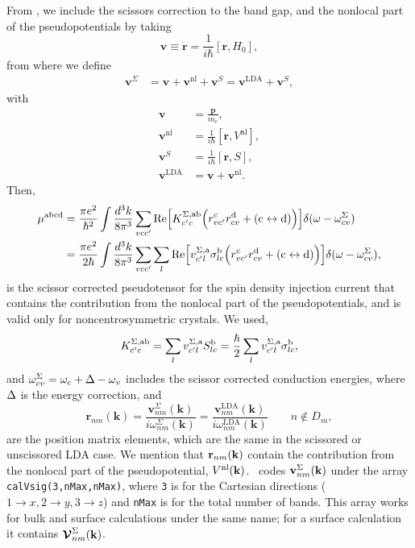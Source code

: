 \documentclass[floatfix,prb,aps,superscriptaddress,11pt]{revtex4}
\begin{document}
From , we include the scissors correction to
the band gap, and the nonlocal part of the pseudopotentials by taking
\begin{equation}
\mathbf{v}\equiv \dot{\mathbf{r}}=\frac{1}{i\hbar }[\mathbf{r},H_0],  
\label{mv}
\end{equation}
from where we define
\begin{align}
\mathbf{v}^\Sigma&=
\mathbf{v} 
+
\mathbf{v}^\mathrm{nl} 
+\mathbf{v}^S 
=
\mathbf{v}^\mathrm{LDA} 
+\mathbf{v}^S 
,
\label{vop2}
\end{align}
with
\begin{align}
\mathbf{v} 
&=\frac{\mathbf{p}}{m_e},
\nonumber\\
\mathbf{v}^\mathrm{nl} 
&=
\frac{1}{i\hbar}[\mathbf{r},V^\mathrm{nl}],\label{vnl}
\\
\mathbf{v}^S 
&=
\frac{1}{i\hbar}[\mathbf{r}, S],
\nonumber\\
\mathbf{v}^\mathrm{LDA} 
&=
\mathbf{v} 
+\mathbf{v}^\mathrm{nl}
.
\end{align}  
Then, 
\begin{align}\label{10.e}
\mu^{\mathrm{abcd}}
&=
\frac{\pi e^2}{\hbar^2}
\int\frac{d^3k}{8\pi^3}
\sum_{vcc'}
\mathrm{Re}\Big[ 
K^{\Sigma,\mathrm{a}\mathrm{b}}_{c'c}
\Big( 
r^{\mathrm{c}}_{vc'} r^{\mathrm{d}}_{cv}
+
(\mathrm{c}\leftrightarrow\mathrm{d}) 
\Big) 
\Big]
\delta(\omega-\omega^\Sigma_{cv}) 
\nonumber\\
&=
\frac{\pi e^2}{2\hbar}
\int\frac{d^3k}{8\pi^3}
\sum_{vcc'}
\sum_l 
\mathrm{Re}\Big[ 
v^{\Sigma,\mathrm{a}}_{c'l}\sigma^{\mathrm{b}}_{lc}
\Big( 
r^{\mathrm{c}}_{vc'} r^{\mathrm{d}}_{cv}
+
(\mathrm{c}\leftrightarrow\mathrm{d}) 
\Big) 
\Big]
\delta(\omega-\omega^\Sigma_{cv}) 
,
\end{align} 
is the scissor corrected pseudotensor for the spin density injection
current that contains the contribution from the nonlocal part of the pseudopotentials,  
and is valid only for noncentrosymmetric crystals. 
We used,
\begin{align}\label{11.e}
K^{\Sigma,\mathrm{a}\mathrm{b}}_{c'c}=\sum_lv^{\Sigma,\mathrm{a}}_{c'l}S^{\mathrm{b}}_{lc}
=\frac{\hbar}{2}\sum_lv^{\Sigma,\mathrm{a}}_{c'l}\sigma^{\mathrm{b}}_{lc}
,
\end{align}
and $\omega^\Sigma_{cv}=\omega_c+\Delta-\omega_v$
includes the scissor corrected conduction energies, where $\Delta$ is the
energy correction, and
\begin{equation}
\mathbf{r}_{nm}(\mathbf{k}) 
=
\frac{\mathbf{v}^\Sigma_{nm}(\mathbf{k})}{i\omega^\Sigma_{nm}(\mathbf{k})}
=
\frac{\mathbf{v}^\mathrm{LDA}_{nm}(\mathbf{k})}{i\omega^\mathrm{LDA}_{nm}(\mathbf{k})}
\quad\quad n\notin D_m 
, 
\label{chon.10}
\end{equation}
are the position matrix elements, which are the same in the scissored or
unscissored LDA case. We mention that $\mathbf{r}_{nm}(\mathbf{k})$ contain the
contribution from the nonlocal part of the pseudopotential,
$V^{\mathrm{nl}}(\mathbf{k})$.
\tiniba~codes $\mathbf{v}^{\Sigma}_{nm}(\mathbf{k})$
under the array \verb=calVsig(3,nMax,nMax)=, where \verb=3= 
is
for the Cartesian directions ($1\to x,2\to y,3\to z$)  
and   \verb=nMax= is for the total number
of bands. This array works for bulk and surface calculations under the
same name; for a surface calculation it contains $\boldsymbol{\mathcal{\cal V}}^{\Sigma}_{nm}(\mathbf{k})$.
\end{document}
